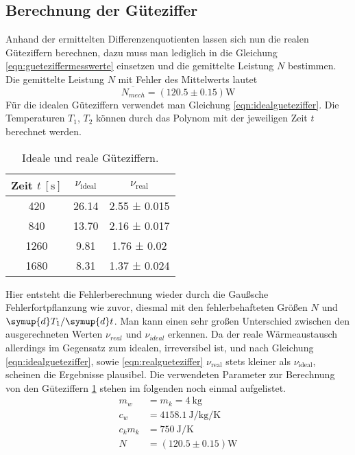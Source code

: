 \subsection{Berechnung der Güteziffer}
Anhand der ermittelten Differenzenquotienten lassen sich nun die realen Güteziffern berechnen, dazu muss man lediglich in die Gleichung \eqref{eqn:gueteziffermesswerte} einsetzen und die
gemittelte Leistung $N$ bestimmen.
Die gemittelte Leistung $N$ mit Fehler des Mittelwerts lautet
\begin{equation}
\overline{N_{mech}} = (120.5 \pm 0.15) \text{W}
\end{equation}
Für die idealen Güteziffern verwendet man Gleichung \eqref{eqn:idealgueteziffer}. Die Temperaturen $T_{1}$, $T_{2}$ können durch das Polynom mit der jeweiligen Zeit $t$ berechnet werden.
\begin{table}
  \centering
  \caption{Ideale und reale Güteziffern.}
  \label{tab:gueteziffernidealundreal}
  \begin{tabular}{c c c}
    \toprule
    Zeit {$t \: [\si{\second}]$} & {$\nu_\text{ideal}$} & {$\nu_\text{real}$} \\
    \midrule
    420  & 26.14 & 2.55 ± 0.015 \\
    840  & 13.70 & 2.16 ± 0.017 \\
    1260  &  9.81 & 1.76 ± 0.02 \\
    1680 &  8.31 & 1.37 ± 0.024\\
    \bottomrule
  \end{tabular}
\end{table}
Hier entsteht die Fehlerberechnung wieder durch die Gaußsche Fehlerfortpflanzung wie zuvor, diesmal mit den fehlerbehafteten Größen $N$ und ${\symup{d}T_{1}}/{\symup{d}t}$.
Man kann einen sehr großen Unterschied zwischen den ausgerechneten Werten $\nu_{real}$ und $\nu_{ideal}$ erkennen. Da der reale Wärmeaustausch allerdings im Gegensatz zum idealen, irreversibel ist,
und nach Gleichung \eqref{eqn:idealgueteziffer}, sowie \eqref{eqn:realgueteziffer} $\nu_{\text{real}}$ stets kleiner als $\nu_{\text{ideal}}$, scheinen die Ergebnisse plausibel.
Die verwendeten Parameter zur Berechnung von den Güteziffern \ref{tab:gueteziffernidealundreal} stehen im folgenden noch einmal aufgelistet.
\begin{align}
m_{w} &= m_{k} = \SI{4}{\kilo\gram} \\
c_{w} &= \SI{4158.1}{\joule\per\kilo\gram\per\kelvin}\\
c_{k}m_{k} &= \SI{750}{\joule\per\kelvin}\\
N &= (120.5 \pm 0.15) \text{W}
\end{align}
